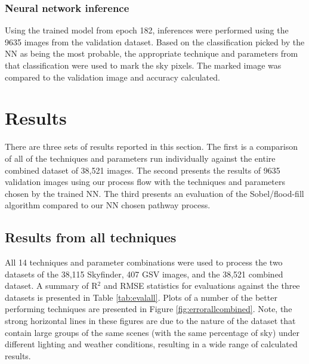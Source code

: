 \documentclass[final,3p,times,authoryear]{elsarticle}
\begin{document}
\subsubsection{Neural network inference}\label{sec:nninference}    
Using the trained model from epoch 182, inferences were performed using the 9635 images from the validation dataset. Based on the classification picked by the NN as being the most probable, the appropriate technique and parameters from that classification were used to mark the sky pixels. The marked image was compared to the validation image and accuracy calculated.

\section{Results}\label{sec:results}


There are three sets of results reported in this section. The first is a comparison of all of the techniques and parameters run individually against the entire combined dataset of 38,521 images. The second presents the results of 9635  validation images using our process flow with the techniques and parameters chosen by the trained NN. The third presents an evaluation of the \cite{Middel2018} Sobel/flood-fill algorithm compared to our NN chosen pathway process.

\subsection{Results from all techniques}\label{sec:resultsall}
All 14 techniques and parameter combinations were used to process the two datasets of the 38,115 Skyfinder, 407 GSV images, and the 38,521 combined dataset. A summary of R$^{2}$ and RMSE statistics for evaluations against the three datasets is presented in Table \ref{tab:evalall}. Plots of a number of the better performing techniques are presented in Figure \ref{fig:errorallcombined}. Note, the strong horizontal lines in these figures are due to the nature of the dataset that contain large groups of the same scenes (with the same percentage of sky) under different lighting and weather conditions, resulting in a wide range of calculated results.
\end{document}
